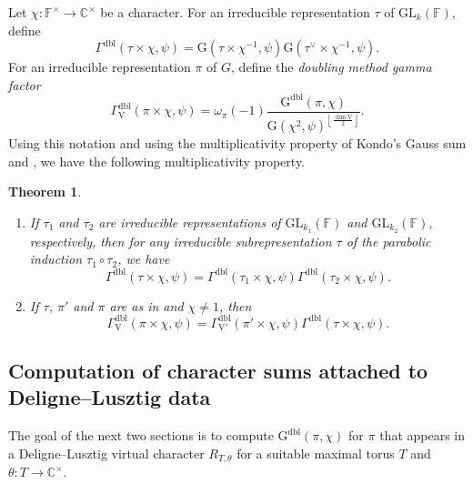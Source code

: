 \documentclass[12pt, reqno]{amsart}
\newtheorem{theorem}{Theorem}[section]
\theoremstyle{definition}
\theoremstyle{definition}
\theoremstyle{definition}
\newcommand{\cComplex}{\mathbb{C}}
\newcommand{\multiplicativegroup}[1]{#1^{\times}}
\newcommand{\hermitianSpace}{\mathrm{V}}
\newcommand{\fieldCharacter}{\psi}
\newcommand{\centralCharacter}[1]{\omega_{#1}}
\newcommand{\Contragradient}[1]{#1^{\vee}}
\newcommand{\GL}{\mathrm{GL}}
\newcommand{\finiteField}{\mathbb{F}}
\newcommand{\GaussSumScalar}[2]{\mathrm{G}\left(#1, #2\right)}
\newcommand{\dblGaussSumScalar}[2]{\mathrm{G}^{\mathrm{dbl}}\left(#1, #2\right)}
\newcommand{\dblGammaFactor}[3]{\Gamma^{\mathrm{dbl}}\left(#1 \times #2, #3\right)}
\newcommand{\dblGammaFactorSpace}[4]{\Gamma^{\mathrm{dbl}}_{#1}\left(#2 \times #3, #4\right)}
\begin{document}
Let $\chi \colon \multiplicativegroup{\finiteField} \to \multiplicativegroup{\cComplex}$ be a character. For an irreducible representation  $\tau$ of $\GL_k\left(\finiteField\right)$, define $$\dblGammaFactor{\tau}{\chi}{\fieldCharacter} = \GaussSumScalar{\tau \times \chi^{-1}}{\fieldCharacter} \GaussSumScalar{\Contragradient{\tau} \times \chi^{-1}}{\fieldCharacter}.$$
For an irreducible representation $\pi$ of $G$, define the \emph{doubling method gamma factor} $$\dblGammaFactorSpace{\hermitianSpace}{\pi}{\chi}{\fieldCharacter} = \centralCharacter{\pi}\left(-1\right) \frac{\dblGaussSumScalar{\pi}{\chi}}{\GaussSumScalar{\chi^2}{\fieldCharacter}^{\left\lfloor\frac{\dim \hermitianSpace}{2}\right\rfloor}}.$$
Using this notation and using the multiplicativity property of Kondo's Gauss sum and , we have the following multiplicativity property.

\begin{theorem}\label{thm:multiplicativity-in-terms-of-gamma-factors}
	\begin{enumerate}
		\item If $\tau_1$ and $\tau_2$ are irreducible representations of $\GL_{k_1}\left(\finiteField\right)$ and $\GL_{k_2}\left(\finiteField\right)$, respectively, then for any irreducible subrepresentation $\tau$ of the parabolic induction $\tau_1 \circ \tau_2$, we have
		$$\dblGammaFactor{\tau}{\chi}{\fieldCharacter} = \dblGammaFactor{\tau_1}{\chi}{\fieldCharacter} \dblGammaFactor{\tau_2}{\chi}{\fieldCharacter}.$$
		\item If $\tau$, $\pi'$ and $\pi$ are as in  and $\chi \ne 1$, then
		$$\dblGammaFactorSpace{\hermitianSpace}{\pi}{\chi}{\fieldCharacter} = \dblGammaFactorSpace{\hermitianSpace'}{\pi'}{\chi}{\fieldCharacter} \dblGammaFactor{\tau}{\chi}{\fieldCharacter}.$$
	\end{enumerate}
\end{theorem}


\subsection{Computation of character sums attached to Deligne--Lusztig data}

The goal of the next two sections is to compute $\dblGaussSumScalar{\pi}{\chi}$ for $\pi$ that appears in a Deligne--Lusztig virtual character $R_{T,\theta}$ for a suitable maximal torus $T$ and $\theta \colon T \to \multiplicativegroup{\cComplex}$.
\end{document}
